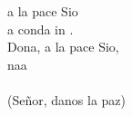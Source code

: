 \begin{cancion}%
	a la pace Sio\\
	a  conda in .\\
	Dona, a la pace Sio,\\
	naa\\
	\jump\\
(Señor, danos la paz)\\
\end{cancion}%
